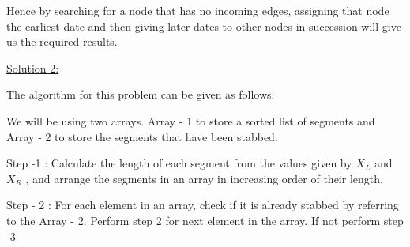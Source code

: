 \documentclass[letterpaper,portrait,12pt]{article}
\begin{document}
\begin{flushleft}

\end{flushleft}


\begin{flushleft}
Hence by searching for a node that has no incoming edges, assigning that node the earliest date and then giving later dates to other nodes in succession will give us the required results.
\end{flushleft}


\begin{flushleft}

\end{flushleft}


\begin{flushleft}
\uline{Solution 2:}
\end{flushleft}


\begin{flushleft}

\end{flushleft}


\begin{flushleft}
The algorithm for this problem can be given as follows:
\end{flushleft}


\begin{flushleft}
We will be using two arrays. Array - 1 to store a sorted list of segments and Array - 2 to store the segments that have been stabbed.
\end{flushleft}


\begin{flushleft}

\end{flushleft}


\begin{flushleft}
Step -1 : Calculate the length of each segment from the values given by $X_L$ and $X_R$ , and arrange the segments in an array in increasing order of their length.
\end{flushleft}


\begin{flushleft}

\end{flushleft}


\begin{flushleft}
Step - 2 : For each element in an array, check if it is already stabbed by referring to the Array - 2. Perform step 2 for next element in the array. If not perform step -3
\end{flushleft}
\end{document}
